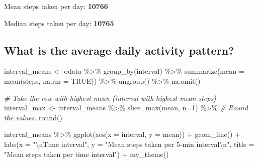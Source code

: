 \documentclass[
  paper=a4,
  ,captions=tableheading
]{scrartcl}
\newenvironment{Shaded}{\begin{snugshade}}{\end{snugshade}}
\newcommand{\AttributeTok}[1]{\textcolor[rgb]{0.77,0.63,0.00}{#1}}
\newcommand{\CommentTok}[1]{\textcolor[rgb]{0.56,0.35,0.01}{\textit{#1}}}
\newcommand{\ConstantTok}[1]{\textcolor[rgb]{0.00,0.00,0.00}{#1}}
\newcommand{\DecValTok}[1]{\textcolor[rgb]{0.00,0.00,0.81}{#1}}
\newcommand{\FunctionTok}[1]{\textcolor[rgb]{0.00,0.00,0.00}{#1}}
\newcommand{\NormalTok}[1]{#1}
\newcommand{\OtherTok}[1]{\textcolor[rgb]{0.56,0.35,0.01}{#1}}
\newcommand{\SpecialCharTok}[1]{\textcolor[rgb]{0.00,0.00,0.00}{#1}}
\newcommand{\StringTok}[1]{\textcolor[rgb]{0.31,0.60,0.02}{#1}}
\begin{document}
Mean steps taken per day: \textbf{10766}

Median steps taken per day: \textbf{10765}

\hypertarget{what-is-the-average-daily-activity-pattern}{%
\subsection{What is the average daily activity
pattern?}\label{what-is-the-average-daily-activity-pattern}}

\begin{Shaded}
\begin{Highlighting}[]
\NormalTok{interval\_means }\OtherTok{\textless{}{-}}\NormalTok{ odata }\SpecialCharTok{\%\textgreater{}\%}
  \FunctionTok{group\_by}\NormalTok{(interval) }\SpecialCharTok{\%\textgreater{}\%}
  \FunctionTok{summarize}\NormalTok{(}\AttributeTok{mean =} \FunctionTok{mean}\NormalTok{(steps, }\AttributeTok{na.rm =} \ConstantTok{TRUE}\NormalTok{)) }\SpecialCharTok{\%\textgreater{}\%}
  \FunctionTok{ungroup}\NormalTok{() }\SpecialCharTok{\%\textgreater{}\%}
  \FunctionTok{na.omit}\NormalTok{()}

\CommentTok{\# Take the row with highest mean (interval with highest mean steps)}
\NormalTok{interval\_max }\OtherTok{\textless{}{-}}\NormalTok{ interval\_means }\SpecialCharTok{\%\textgreater{}\%}
  \FunctionTok{slice\_max}\NormalTok{(mean, }\AttributeTok{n=}\DecValTok{1}\NormalTok{) }\SpecialCharTok{\%\textgreater{}\%}
  \CommentTok{\# Round the values.}
  \FunctionTok{round}\NormalTok{()}

\NormalTok{interval\_means }\SpecialCharTok{\%\textgreater{}\%}
  \FunctionTok{ggplot}\NormalTok{(}\FunctionTok{aes}\NormalTok{(}\AttributeTok{x =}\NormalTok{ interval, }\AttributeTok{y =}\NormalTok{ mean)) }\SpecialCharTok{+}
  \FunctionTok{geom\_line}\NormalTok{() }\SpecialCharTok{+}
  \FunctionTok{labs}\NormalTok{(}\AttributeTok{x =} \StringTok{"}\SpecialCharTok{\textbackslash{}n}\StringTok{Time interval"}\NormalTok{,}
       \AttributeTok{y =} \StringTok{"Mean steps taken per 5{-}min interval}\SpecialCharTok{\textbackslash{}n}\StringTok{"}\NormalTok{,}
       \AttributeTok{title =} \StringTok{"Mean steps taken per time interval"}\NormalTok{) }\SpecialCharTok{+} 
  \FunctionTok{my\_theme}\NormalTok{()}
\end{Highlighting}
\end{Shaded}
\end{document}
